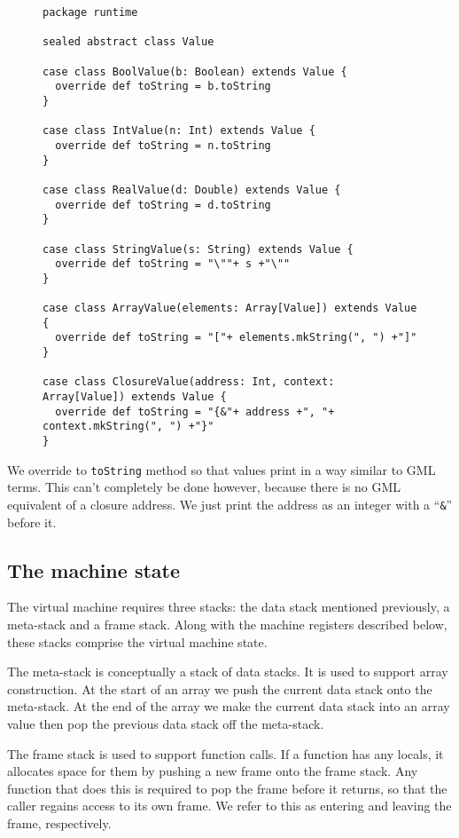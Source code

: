 \begin{figure}
\begin{verbatim}
package runtime

sealed abstract class Value

case class BoolValue(b: Boolean) extends Value {
  override def toString = b.toString
}

case class IntValue(n: Int) extends Value {
  override def toString = n.toString
}

case class RealValue(d: Double) extends Value {
  override def toString = d.toString
}

case class StringValue(s: String) extends Value {
  override def toString = "\""+ s +"\""
}

case class ArrayValue(elements: Array[Value]) extends Value {
  override def toString = "["+ elements.mkString(", ") +"]"
}

case class ClosureValue(address: Int, context: Array[Value]) extends Value {
  override def toString = "{&"+ address +", "+ context.mkString(", ") +"}"
}
\end{verbatim}
\getcaption
\end{figure}

We override to \verb!toString! method
so that values print in a way similar to GML terms.
This can't completely be done however,
because there is no GML equivalent of a closure address.
We just print the address as an integer with a ``\verb!&!'' before it.


\subsection{The machine state}

The virtual machine requires three stacks:
the data stack mentioned previously,
a meta-stack and a frame stack.
Along with the machine registers described below,
these stacks comprise the virtual machine state.

The meta-stack is conceptually a stack of data stacks.
It is used to support array construction.
At the start of an array we push the current data stack onto the meta-stack.
At the end of the array we make the current data stack into an array value
then pop the previous data stack off the meta-stack.

The frame stack is used to support function calls.
If a function has any locals,
it allocates space for them by pushing a new frame onto the frame stack.
Any function that does this is required to pop the frame before it returns,
so that the caller regains access to its own frame.
We refer to this as entering and leaving the frame, respectively.

